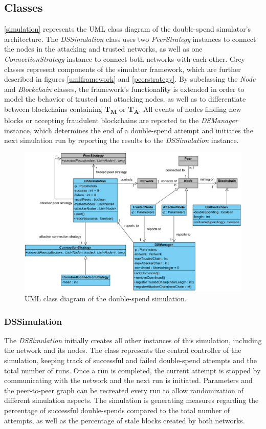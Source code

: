 \documentclass[a4paper,12pt,twoside]{report}
\begin{document}
\subsection{Classes}
\autoref{simulation} represents the UML class diagram of the double-spend simulator's architecture. The \textit{DSSimulation} class uses two \textit{PeerStrategy} instances to connect the nodes in the attacking and trusted networks, as well as one \textit{ConnectionStrategy} instance to connect both networks with each other. Grey classes represent components of the simulator framework, which are further described in figures \ref{umlframework} and \ref{peerstrategy}. By subclassing the \textit{Node} and \textit{Blockchain} classes, the framework's functionality is extended in order to model the behavior of trusted and attacking nodes, as well as to differentiate between blockchains containing \textbf{T\textsubscript{M}} or \textbf{T\textsubscript{A}}. All events of nodes finding new blocks or accepting fraudulent blockchains are reported to the \textit{DSManager} instance, which determines the end of a double-spend attempt and initiates the next simulation run by reporting the results to the \textit{DSSimulation} instance.
\begin{figure}
	\centering
  \includegraphics[width=\textwidth]{Simulation.png}
	\caption{UML class diagram of the double-spend simulation.}
	\label{simulation}
\end{figure}
\subsubsection{DSSimulation}
The \textit{DSSimulation} initially creates all other instances of this simulation, including the network and its nodes. The class represents the central controller of the simulation, keeping track of successful and failed double-spend attempts and the total number of runs. Once a run is completed, the current attempt is stopped by communicating with the network and the next run is initiated. Parameters and the peer-to-peer graph can be recreated every run to allow randomization of different simulation aspects. The simulation is generating measures regarding the percentage of successful double-spends compared to the total number of attempts, as well as the percentage of stale blocks created by both networks.
\end{document}
